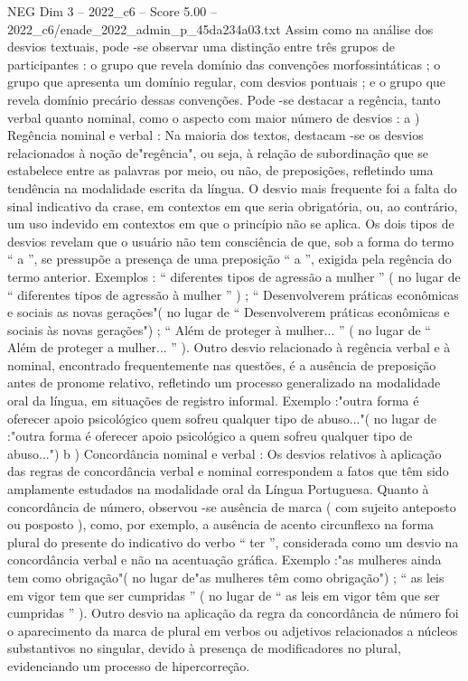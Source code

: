 \begin{textsample}{NEG Dim 3 – 2022\_c6 – Score 5.00 – 2022\_c6/enade\_2022\_admin\_p\_45da234a03.txt}
Assim como na análise dos desvios textuais, pode -se observar uma distinção entre três grupos de participantes : o grupo que revela domínio das convenções morfossintáticas ; o grupo que apresenta um domínio regular, com desvios pontuais ; e o grupo que revela domínio precário dessas convenções.
Pode -se destacar a regência, tanto verbal quanto nominal, como o aspecto com maior número de desvios : a ) Regência nominal e verbal : Na maioria dos textos, destacam -se os desvios relacionados à noção de"regência", ou seja, à relação de subordinação que se estabelece entre as palavras por meio, ou não, de preposições, refletindo uma tendência na modalidade escrita da língua.
O desvio mais frequente foi a falta do sinal indicativo da crase, em contextos em que seria obrigatória, ou, ao contrário, um uso indevido em contextos em que o princípio não se aplica.
Os dois tipos de desvios revelam que o usuário não tem consciência de que, sob a forma do termo “ a ”, se pressupõe a presença de uma preposição “ a ”, exigida pela regência do termo anterior.
Exemplos : “ diferentes tipos de agressão a mulher ” ( no lugar de “ diferentes tipos de agressão à mulher ” ) ; “ Desenvolverem práticas econômicas e sociais as novas gerações"( no lugar de “ Desenvolverem práticas econômicas e sociais às novas gerações") ; “ Além de proteger à mulher... ” ( no lugar de “ Além de proteger a mulher... ” ).
Outro desvio relacionado à regência verbal e à nominal, encontrado frequentemente nas questões, é a ausência de preposição antes de pronome relativo, refletindo um processo generalizado na modalidade oral da língua, em situações de registro informal.
Exemplo :"outra forma é oferecer apoio psicológico quem sofreu qualquer tipo de abuso..."( no lugar de :"outra forma é oferecer apoio psicológico a quem sofreu qualquer tipo de abuso...") b ) Concordância nominal e verbal : Os desvios relativos à aplicação das regras de concordância verbal e nominal correspondem a fatos que têm sido amplamente estudados na modalidade oral da Língua Portuguesa.
Quanto à concordância de número, observou -se ausência de marca ( com sujeito anteposto ou posposto ), como, por exemplo, a ausência de acento circunflexo na forma plural do presente do indicativo do verbo “ ter ”, considerada como um desvio na concordância verbal e não na acentuação gráfica.
Exemplo :"as mulheres ainda tem como obrigação"( no lugar de"as mulheres têm como obrigação") ; “ as leis em vigor tem que ser cumpridas ” ( no lugar de “ as leis em vigor têm que ser cumpridas ” ).
Outro desvio na aplicação da regra da concordância de número foi o aparecimento da marca de plural em verbos ou adjetivos relacionados a núcleos substantivos no singular, devido à presença de modificadores no plural, evidenciando um processo de hipercorreção.

\end{textsample}
